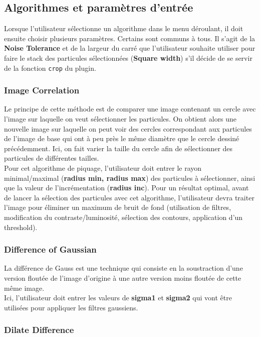 \documentclass[12pt,a4paper]{report}
\begin{document}
\subsection{Algorithmes et paramètres d'entrée}

Lorsque l'utilisateur sélectionne un algorithme dans le menu déroulant, il doit ensuite choisir plusieurs paramètres.
Certains sont communs à tous. Il s'agit de la \textbf{Noise Tolerance} et de la largeur du carré que l'utilisateur souhaite utiliser pour faire le stack des particules sélectionnées (\textbf{Square width}) s'il décide de se servir de la fonction \texttt{crop} du plugin.

\subsubsection{Image Correlation}

Le principe de cette méthode est de comparer une image contenant un cercle avec l'image sur laquelle on veut sélectionner les particules. On obtient alors une nouvelle image sur laquelle on peut voir des cercles correspondant aux particules de l'image de base qui ont à peu près le même diamètre que le cercle dessiné précédemment. Ici, on fait varier la taille du cercle afin de sélectionner des particules de différentes tailles.\\
\noindent
Pour cet algorithme de piquage, l'utilisateur doit entrer le rayon minimal/maximal (\textbf{radius min, radius max}) des particules à sélectionner, ainsi que la valeur de l'incrémentation (\textbf{radius inc}). Pour un résultat optimal, avant de lancer la sélection des particules avec cet algorithme, l'utilisateur devra traiter l'image pour éliminer un maximum de bruit de fond (utilisation de filtres, modification du contraste/luminosité, sélection des contours, application d'un threshold).

\subsubsection{Difference of Gaussian}

La différence de Gauss est une technique qui consiste en la soustraction d'une version floutée de l'image d'origine à une autre version moins floutée de cette même image.\\
Ici, l'utilisateur doit entrer les valeurs de \textbf{sigma1} et \textbf{sigma2} qui vont être utilisées pour appliquer les filtres gaussiens.

\subsubsection{Dilate Difference}
\end{document}
